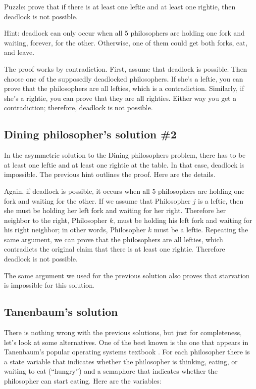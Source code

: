 \documentclass{book}
\begin{document}
Puzzle: prove that if there is at least one leftie and at least one
rightie, then deadlock is not possible.

Hint: deadlock can only occur when all 5 philosophers are holding
one fork and waiting, forever, for the other.  Otherwise, one of
them could get both forks, eat, and leave.

The proof works by contradiction.  First, assume that deadlock is
possible.  Then choose one of the supposedly deadlocked philosophers.
If she's a leftie, you can prove that the philosophers are all
lefties, which is a contradiction.  Similarly, if she's a rightie, you
can prove that they are all righties.  Either way you get a
contradiction; therefore, deadlock is not possible.



\subsection{Dining philosopher's solution \#2}

In the asymmetric solution to the Dining philosophers problem,
there has to be at least one leftie and at least one rightie at
the table.  In that case, deadlock is impossible.  The previous
hint outlines the proof.  Here are the details.

Again, if deadlock is possible, it occurs when all 5 philosophers
are holding one fork and waiting for the other.  If we assume that
Philosopher $j$ is a leftie, then she must be holding her left
fork and waiting for her right.  Therefore her neighbor to the right,
Philosopher $k$, must be holding his left fork and waiting for
his right neighbor; in other words, Philosopher $k$ must be a leftie.
Repeating the same argument, we can prove that the philosophers
are all lefties, which contradicts the original claim that there
is at least one rightie.  Therefore deadlock is not possible.

The same argument we used for the previous solution also proves
that starvation is impossible for this solution.



\subsection{Tanenbaum's solution}

There is nothing wrong with the previous solutions, but just for
completeness, let's look at some alternatives.  One of the best known
is the one that appears in Tanenbaum's popular operating systems
textbook \cite{tanenbaum}.
For each philosopher there is a state variable that
indicates whether the philosopher is thinking, eating, or waiting to
eat (``hungry'') and a semaphore that indicates whether the
philosopher can start eating.  Here are the variables:
\end{document}
